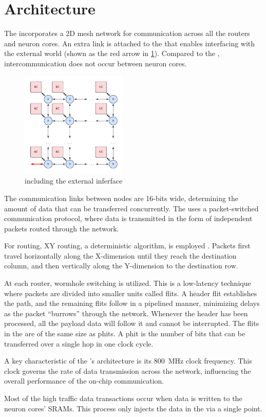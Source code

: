\section{Architecture}
The \confignoc{} incorporates a 2D mesh network for communication across all the routers and neuron cores.
An extra link is attached to the \confignoc{} that enables interfacing with the external world (shown as the red arrow in \cref{fig:config_noc_ext}).
Compared to the \eventnoc{}, intercommunication does not occur between neuron cores.

\begin{figure}[hbtp]
\centering    
\includegraphics[width=0.45\textwidth]{assets/config_noc_inj.pdf}
\caption{\confignoc{} including the external inferface}
\label{fig:config_noc_ext}
\end{figure}

The communication links between nodes are 16-bits wide, determining the amount of data that can be transferred concurrently.
The \confignoc{} uses a packet-switched communication protocol, where data is transmitted in the form of independent packets routed through the network.

For routing, XY routing, a deterministic algorithm, is employed \autocite{glassTurnModelAdaptive1992}.
Packets first travel horizontally along the X-dimension until they reach the destination column, and then vertically along the Y-dimension to the destination row.

At each router, wormhole switching is utilized.
This is a low-latency technique where packets are divided into smaller units called flits.
A header flit establishes the path, and the remaining flits follow in a pipelined manner, minimizing delays as the packet ``burrows'' through the network.
Whenever the header has been processed, all the payload data will follow it and cannot be interrupted.
The flits in the \confignoc{} are of the same size as phits.
A phit is the number of bits that can be transferred over a single hop in one clock cycle.

A key characteristic of the \confignoc{}'s architecture is its \SI{800}{MHz} clock frequency.
This clock governs the rate of data transmission across the network, influencing the overall performance of the on-chip communication.

Most of the high traffic data transactions occur when data is written to the neuron cores' SRAMs.
This process only injects the data in the \confignoc{} via a single point.
